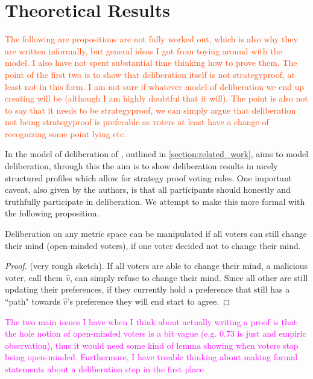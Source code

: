\newpage
\chapter{Theoretical Results}
\label{theory}

\textcolor{OrangeRed}{The following are propositions are not fully worked out, which is also why they are written informally, but general ideas I got from toying around with the model. I also have not spent substantial time thinking how to prove them. The point of the first two is to show that deliberation itself is not strategyproof, at least not in this form. I am not sure if whatever model of deliberation we end up creating will be (although I am highly doubtful that it will). The point is also not to say that it needs to be strategyproof, we can simply argue that deliberation not being strategyproof is preferable as voters at least have a change of recognizing some point lying etc.}

In the model of deliberation of \citet{radDeliberationSinglePeakednessCoherent2021a}, outlined in \cref{section:related_work}, aims to model deliberation, through this the aim is to show deliberation results in nicely structured profiles which allow for strategy proof voting rules. One important caveat, also given by the authors, is that all participants should honestly and truthfully participate in deliberation. We attempt to make this more formal with the following proposition.

\begin{proposition}
	Deliberation on any metric space can be manipulated if all voters can still change their mind (open-minded voters), if one voter decided not to change their mind.
\end{proposition}

\begin{proof}{(very rough sketch).} If all voters are able to change their mind, a malicious voter, call them $\hat{v}$, can simply refuse to change their mind. Since all other are still updating their preferences, if they currently hold a preference that still has a ``path" towards $\hat{v}$'s preference they will end start to agree.\end{proof}

\textcolor{Fuchsia}{The two main issues I have when I think about actually writing a proof is that the hole notion of open-minded voters is a bit vague (e.g. 0.73 is just and empiric observation), thus it would need some kind of lemma showing when voters stop being open-minded. Furthermore, I have trouble thinking about making formal statements about a deliberation step in the first place}

